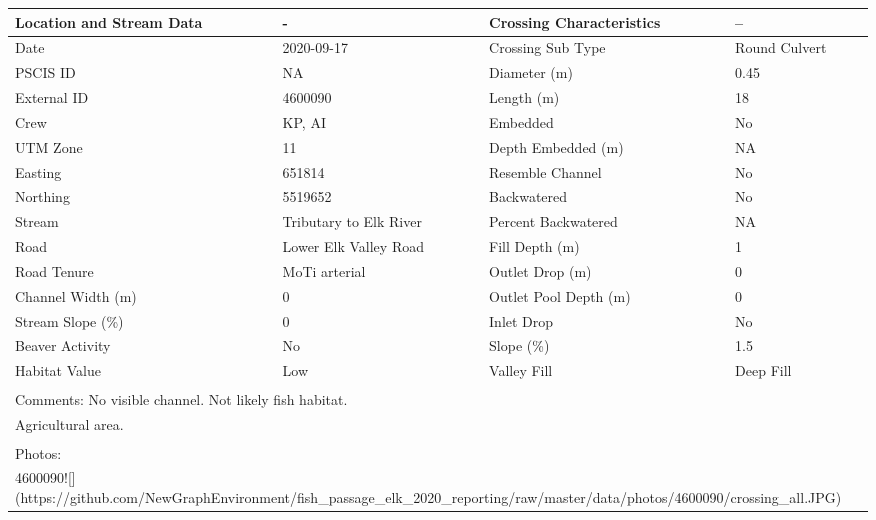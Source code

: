 \documentclass[
]{book}
\begin{document}
\begin{tabular}{l|l|l|l}
\hline
Location and Stream Data & - & Crossing Characteristics & --\\
\hline
Date & 2020-09-17 & Crossing Sub Type & Round Culvert\\
\hline
PSCIS ID & NA & Diameter (m) & 0.45\\
\hline
External ID & 4600090 & Length (m) & 18\\
\hline
Crew & KP, AI & Embedded & No\\
\hline
UTM Zone & 11 & Depth Embedded (m) & NA\\
\hline
Easting & 651814 & Resemble Channel & No\\
\hline
Northing & 5519652 & Backwatered & No\\
\hline
Stream & Tributary to Elk River & Percent Backwatered & NA\\
\hline
Road & Lower Elk Valley Road & Fill Depth (m) & 1\\
\hline
Road Tenure & MoTi arterial & Outlet Drop (m) & 0\\
\hline
Channel Width (m) & 0 & Outlet Pool Depth (m) & 0\\
\hline
Stream Slope (\%) & 0 & Inlet Drop & No\\
\hline
Beaver Activity & No & Slope (\%) & 1.5\\
\hline
Habitat Value & Low & Valley Fill & Deep Fill\\
\hline
\multicolumn{4}{l}{\textsuperscript{} Comments: No visible channel. Not likely fish habitat.}\\
\multicolumn{4}{l}{Agricultural area.}\\
\multicolumn{4}{l}{\textsuperscript{} Photos:}\\
\multicolumn{4}{l}{4600090![](https://github.com/NewGraphEnvironment/fish\_passage\_elk\_2020\_reporting/raw/master/data/photos/4600090/crossing\_all.JPG)}\\
\end{tabular}
\end{document}
